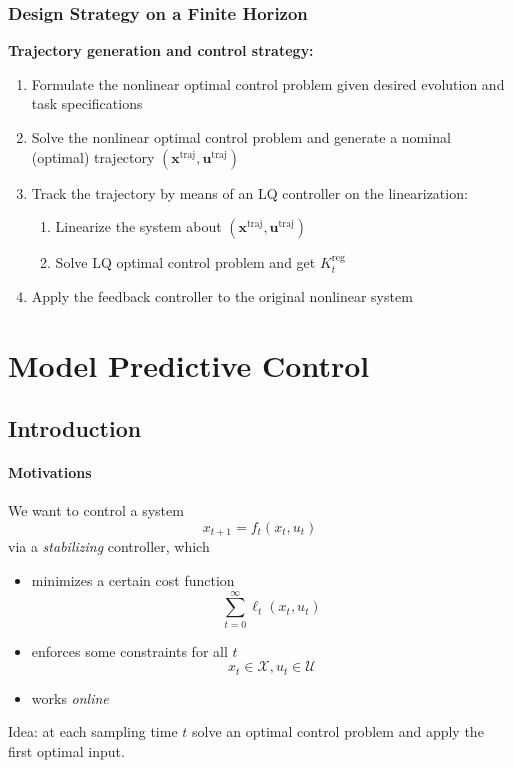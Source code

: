 \documentclass[openany]{book}
\theoremstyle{definition}
\theoremstyle{remark}
\begin{document}
\subsection{Design Strategy on a Finite Horizon}
\textbf{Trajectory generation and control strategy:}
\begin{enumerate}
    \item Formulate the nonlinear optimal control problem given desired evolution and task specifications
    \item Solve the nonlinear optimal control problem and generate a nominal (optimal) trajectory $(\mathbf{x}^{\text{traj}}, \mathbf{u}^{\text{traj}})$
    \item Track the trajectory by means of an LQ controller on the linearization:
        \begin{enumerate}
            \item Linearize the system about $(\mathbf{x}^{\text{traj}}, \mathbf{u}^{\text{traj}})$
            \item Solve LQ optimal control problem and get $K_t^{\text{reg}}$
        \end{enumerate}
    \item Apply the feedback controller to the original nonlinear system
\end{enumerate}


\chapter{Model Predictive Control}
\section{Introduction}
\subsubsection{Motivations}
We want to control a system 
\[
    x_{t+1} = f_t(x_t,u_t)
\]
via a \emph{stabilizing} controller, which
\begin{itemize}
    \item minimizes a certain cost function \[
            \displaystyle\sum_{t=0}^{\infty}\ell_t(x_t,u_t)
        \]
    \item enforces some constraints for all $t$ 
        \[
            x_t \in \mathcal{X}, u_t \in \mathcal{U}
        \]
    \item works \emph{online}
\end{itemize}
Idea: at each sampling time $t$ solve an optimal control problem and apply the first optimal input.
\end{document}
